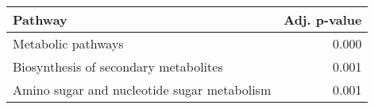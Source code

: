\begin{tabular}{lr}
\toprule
                                     Pathway &  Adj. p-value \\
\midrule
                          Metabolic pathways &         0.000 \\
       Biosynthesis of secondary metabolites &         0.001 \\
 Amino sugar and nucleotide sugar metabolism &         0.001 \\
\bottomrule
\end{tabular}
